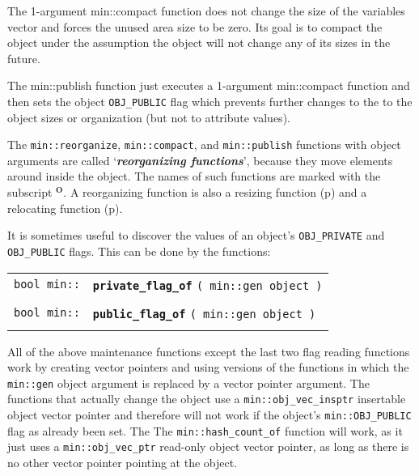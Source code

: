 \documentclass[12pt]{article}
\makeatletter
\newcommand{\skey}[2]{{\bf \em #1#2}\index{#1}}
\newcommand{\ttindex}[1]{\index{#1@{\tt #1}}}
\newcommand{\subsmkey}[2]{$\mathbf{^{#1}}$\index{#1@$^{#1}$!#2}}
\newcommand{\minindex}[1]{\ttindex{min::#1}\ttindex{#1}}
\newcommand{\pagref}[1]{p\pageref{#1}}
\newcommand{\EOL}{\penalty \exhyphenpenalty}
\newenvironment{indpar}[1][0.3in]%
	{\begin{list}{}%
		     {\setlength{\itemsep}{0in}%
		      \setlength{\topsep}{0in}%
		      \setlength{\parsep}{1ex}%
		      \setlength{\labelwidth}{#1}%
		      \setlength{\leftmargin}{#1}%
		      \addtolength{\leftmargin}{\labelsep}}%
	 \item}%
	{\end{list}}
\newcommand{\LABEL}[1]{\label{#1}}
\newcommand{\MINKEY}[1]{{\tt \bf #1}\minindex{#1}}
\makeatother
\begin{document}
The 1-argument {min::compact} function does not change the
size of the variables vector and forces the unused area size
to be zero.  Its goal is to compact the object under the assumption
the object will not change any of its sizes in the future.

The {min::publish} function just executes a
1-argument {min::compact} function and then sets
the object {\tt OBJ\_\EOL PUBLIC} flag which prevents further changes to the
to the object sizes or organization (but not to attribute values).

The {\tt min::reorganize}, {\tt min::compact}, and {\tt min::\EOL publish}
functions with object arguments
are called `\skey{reorganizing function}s'\label{REORGANIZING-FUNCTIONS},
because they move elements around inside the object.
The names of such functions are marked with the subscript
\subsmkey{O}{of function}.
A reorganizing function is also a resizing function
(\pagref{RESIZING-FUNCTIONS}) and
a relocating function (\pagref{RELOCATING-FUNCTIONS}).

It is sometimes useful to discover the values of an object's
{\tt OBJ\_\EOL PRIVATE} and {\tt OBJ\_\EOL PUBLIC} flags.
This can be done by the functions:

\begin{indpar}\begin{tabular}{r@{}l}
\verb|bool min::| & \MINKEY{private\_flag\_of}
    \verb|( min::gen object )| \\
\LABEL{MIN::PRIVATE_FLAG_OF} \\
\verb|bool min::| & \MINKEY{public\_flag\_of}
    \verb|( min::gen object )| \\
\LABEL{MIN::PUBLIC_FLAG_OF} \\
\end{tabular}\end{indpar}

All of the above maintenance functions except the last two
flag reading functions work by creating
vector pointers and using versions of the functions in which the
{\tt min::gen} object argument is replaced by a vector pointer argument.
The functions that actually change the object use a
{\tt min::\EOL obj\_\EOL vec\_\EOL insptr} insertable object
vector pointer and therefore will not work if the object's
{\tt min::\EOL OBJ\_\EOL PUBLIC} flag as already been set.  The
The {\tt min::hash\_count\_of} function will work, as it just uses a
{\tt min::\EOL obj\_\EOL vec\_\EOL ptr} read-only object vector pointer,
as long as there is no other vector pointer pointing at the object.
\end{document}
